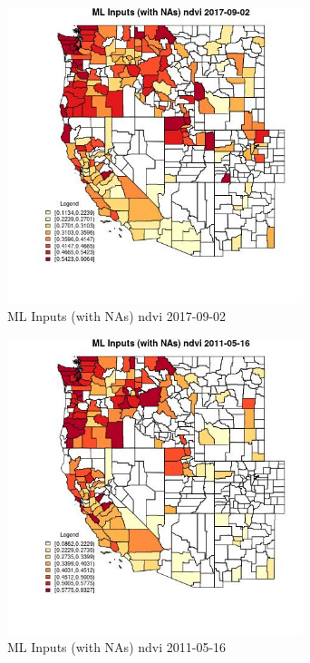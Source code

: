 \begin{figure} 
\centering  
\includegraphics[width=0.77\textwidth]{Code_Outputs/Report_ML_input_PM25_Step4_part_e_de_duplicated_aves_compiled_2019-05-21wNAs_CountyndviMean2017-09-02.jpg} 
\caption{\label{fig:Report_ML_input_PM25_Step4_part_e_de_duplicated_aves_compiled_2019-05-21wNAsCountyndviMean2017-09-02}ML Inputs (with NAs) ndvi 2017-09-02} 
\end{figure} 
 

\begin{figure} 
\centering  
\includegraphics[width=0.77\textwidth]{Code_Outputs/Report_ML_input_PM25_Step4_part_e_de_duplicated_aves_compiled_2019-05-21wNAs_CountyndviMean2011-05-16.jpg} 
\caption{\label{fig:Report_ML_input_PM25_Step4_part_e_de_duplicated_aves_compiled_2019-05-21wNAsCountyndviMean2011-05-16}ML Inputs (with NAs) ndvi 2011-05-16} 
\end{figure} 
 

